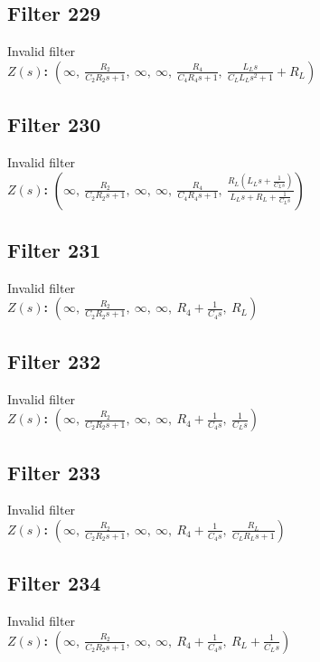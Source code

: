 \documentclass{article}
\begin{document}
\subsection*{Filter 229}
Invalid filter \\ 
\textbf{$Z(s)$:} $\left( \infty, \  \frac{R_{2}}{C_{2} R_{2} s + 1}, \  \infty, \  \infty, \  \frac{R_{4}}{C_{4} R_{4} s + 1}, \  \frac{L_{L} s}{C_{L} L_{L} s^{2} + 1} + R_{L}\right)$ \\ 
\subsection*{Filter 230}
Invalid filter \\ 
\textbf{$Z(s)$:} $\left( \infty, \  \frac{R_{2}}{C_{2} R_{2} s + 1}, \  \infty, \  \infty, \  \frac{R_{4}}{C_{4} R_{4} s + 1}, \  \frac{R_{L} \left(L_{L} s + \frac{1}{C_{L} s}\right)}{L_{L} s + R_{L} + \frac{1}{C_{L} s}}\right)$ \\ 
\subsection*{Filter 231}
Invalid filter \\ 
\textbf{$Z(s)$:} $\left( \infty, \  \frac{R_{2}}{C_{2} R_{2} s + 1}, \  \infty, \  \infty, \  R_{4} + \frac{1}{C_{4} s}, \  R_{L}\right)$ \\ 
\subsection*{Filter 232}
Invalid filter \\ 
\textbf{$Z(s)$:} $\left( \infty, \  \frac{R_{2}}{C_{2} R_{2} s + 1}, \  \infty, \  \infty, \  R_{4} + \frac{1}{C_{4} s}, \  \frac{1}{C_{L} s}\right)$ \\ 
\subsection*{Filter 233}
Invalid filter \\ 
\textbf{$Z(s)$:} $\left( \infty, \  \frac{R_{2}}{C_{2} R_{2} s + 1}, \  \infty, \  \infty, \  R_{4} + \frac{1}{C_{4} s}, \  \frac{R_{L}}{C_{L} R_{L} s + 1}\right)$ \\ 
\subsection*{Filter 234}
Invalid filter \\ 
\textbf{$Z(s)$:} $\left( \infty, \  \frac{R_{2}}{C_{2} R_{2} s + 1}, \  \infty, \  \infty, \  R_{4} + \frac{1}{C_{4} s}, \  R_{L} + \frac{1}{C_{L} s}\right)$ \\ 
\end{document}

